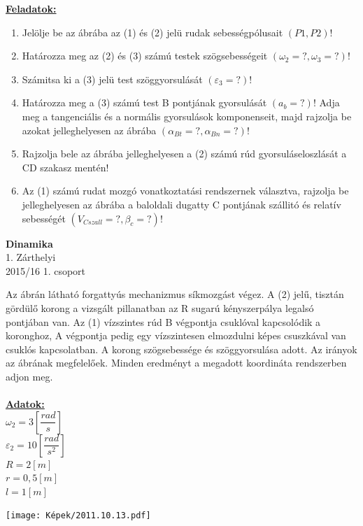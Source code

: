\documentclass[11pt,a4paper]{article}
\begin{document}
\underline{\textbf{Feladatok:}}
\begin{enumerate}
    \item Jelölje be az ábrába az (1) és (2) jelü rudak sebességpólusait \((P1, P2)\)!
    \item Határozza meg az (2) és (3) számú testek szögsebességeit \((\omega_2 =?, \omega_3 =?)\)!
    \item Számitsa ki a (3) jelü test szöggyorsulását \((\varepsilon_3 = ?)\)!
    \item Határozza meg a (3) számú test B pontjának gyorsulását \((a_b =?)\)! Adja meg a
    tangenciális és a normális gyorsulások komponenseit, majd rajzolja be azokat
    jelleghelyesen az ábrába \((\alpha_{Bt} =?, \alpha_{Bn} = ?)\)!
    \item Rajzolja bele az ábrába jelleghelyesen a (2) számú rúd gyorsuláseloszlását a CD szakasz
    mentén!
    \item Az (1) számú rudat mozgó vonatkoztatási rendszernek választva, rajzolja be
    jelleghelyesen az ábrába a baloldali dugatty C pontjának szállitó és relatív sebességét
    \((V_{Cszall} = ?, \beta_c = ?)\)!
\end{enumerate}

\newpage

\begin{center}
    \textbf{\LARGE{Dinamika}}\\
    1. Zárthelyi\\
    2015/16 1. csoport
\end{center}
Az ábrán látható forgattyús mechanizmus síkmozgást végez. A (2) jelű, tisztán gördülő korong a vizsgált pillanatban az R sugarú kényszerpálya legalsó pontjában van. Az (1) vízszintes rúd B végpontja csuklóval kapcsolódik a koronghoz, A végpontja pedig egy vízszintesen elmozdulni képes csuszkával van csuklós kapcsolatban. A korong szögsebessége és szöggyorsulása adott. Az irányok az ábrának megfelelőek. Minden eredményt a megadott koordináta rendszerben adjon meg.\\\\
\underline{\textbf{Adatok:}}\\
$\omega_2 = 3 \left[\dfrac{rad}{s}\right]$\\
$\varepsilon_2 = 10 \left[\dfrac{rad}{s^2}\right]$\\
$R = 2 [m]$\\
$r = 0,5 [m]$\\
$l = 1 [m]$\\
\begin{center}
    \texttt{[image: Képek/2011.10.13.pdf]}
\end{center}
\end{document}
